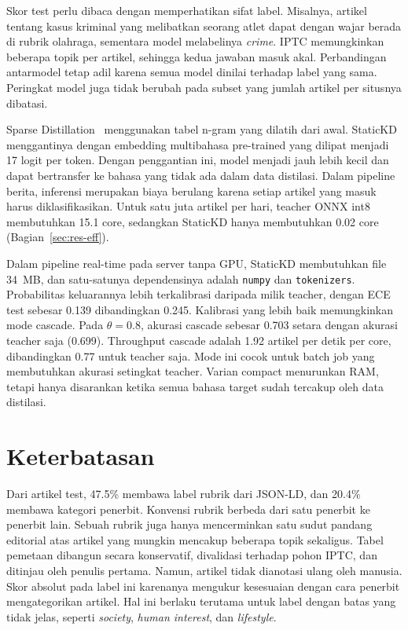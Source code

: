 \documentclass[journal]{IEEEtran}
\begin{document}
Skor test perlu dibaca dengan memperhatikan sifat label. Misalnya, artikel tentang kasus kriminal yang melibatkan seorang atlet dapat dengan wajar berada di rubrik olahraga, sementara model melabelinya \emph{crime}. IPTC memungkinkan beberapa topik per artikel, sehingga kedua jawaban masuk akal. Perbandingan antarmodel tetap adil karena semua model dinilai terhadap label yang sama. Peringkat model juga tidak berubah pada subset yang jumlah artikel per situsnya dibatasi.

Sparse Distillation~\cite{ye2022sparse} menggunakan tabel n-gram yang dilatih dari awal. StaticKD menggantinya dengan embedding multibahasa pre-trained yang dilipat menjadi 17 logit per token. Dengan penggantian ini, model menjadi jauh lebih kecil dan dapat bertransfer ke bahasa yang tidak ada dalam data distilasi. Dalam pipeline berita, inferensi merupakan biaya berulang karena setiap artikel yang masuk harus diklasifikasikan. Untuk satu juta artikel per hari, teacher ONNX int8 membutuhkan 15.1 core, sedangkan StaticKD hanya membutuhkan 0.02 core (Bagian~\ref{sec:res-eff}).

Dalam pipeline real-time pada server tanpa GPU, StaticKD membutuhkan file 34~MB, dan satu-satunya dependensinya adalah \texttt{numpy} dan \texttt{tokenizers}. Probabilitas keluarannya lebih terkalibrasi daripada milik teacher, dengan ECE test sebesar 0.139 dibandingkan 0.245. Kalibrasi yang lebih baik memungkinkan mode cascade. Pada $\theta=0.8$, akurasi cascade sebesar 0.703 setara dengan akurasi teacher saja (0.699). Throughput cascade adalah 1.92 artikel per detik per core, dibandingkan 0.77 untuk teacher saja. Mode ini cocok untuk batch job yang membutuhkan akurasi setingkat teacher. Varian compact menurunkan RAM, tetapi hanya disarankan ketika semua bahasa target sudah tercakup oleh data distilasi.

\section{Keterbatasan}
\label{sec:limitations}
Dari artikel test, 47.5\% membawa label rubrik dari JSON-LD, dan 20.4\% membawa kategori penerbit. Konvensi rubrik berbeda dari satu penerbit ke penerbit lain. Sebuah rubrik juga hanya mencerminkan satu sudut pandang editorial atas artikel yang mungkin mencakup beberapa topik sekaligus. Tabel pemetaan dibangun secara konservatif, divalidasi terhadap pohon IPTC, dan ditinjau oleh penulis pertama. Namun, artikel tidak dianotasi ulang oleh manusia. Skor absolut pada label ini karenanya mengukur kesesuaian dengan cara penerbit mengategorikan artikel. Hal ini berlaku terutama untuk label dengan batas yang tidak jelas, seperti \emph{society}, \emph{human interest}, dan \emph{lifestyle}.
\end{document}
